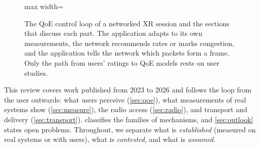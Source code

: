 \begin{figure}[t]
\begin{adjustbox}{max width=\linewidth}
\end{adjustbox}
\caption{The QoE control loop of a networked XR session and the sections that discuss each part. The
application adapts to its own measurements, the network recommends rates or marks congestion, and the
application tells the network which packets form a frame. Only the path from users' ratings to QoE models
rests on user studies.}
\label{fig:loop}
\end{figure}

This review covers work published from 2023 to 2026 and follows the loop from the user outwards:
what users perceive (\cref{sec:qoe}), what measurements of real systems show (\cref{sec:measure}), the
radio access (\cref{sec:radio}), and transport and delivery (\cref{sec:transport}). 
classifies the families of mechanisms, and \cref{sec:outlook} states open problems. Throughout, we
separate what is \emph{established} (measured on real systems or with users), what is \emph{contested},
and what is \emph{assumed}.
